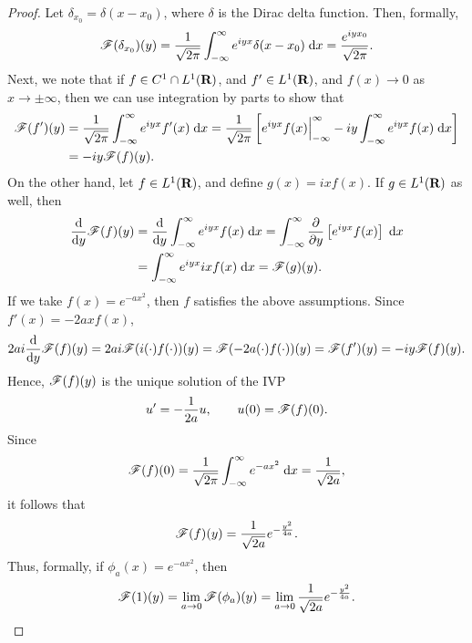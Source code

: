 \documentclass{homework}
\begin{document}
\begin{arabicparts}
		\begin{proof}
			Let $\delta_{x_0} = \delta(x-x_0)$, where $\delta$ is the Dirac delta function. Then, formally,
			\begin{equation}
				\mathscr{F}(\delta_{x_0})(y) = \frac{1}{\sqrt{2\pi}}\int_{-\infty}^\infty e^{iyx}\delta(x-x_0)\;\text{d} x = \frac{e^{iyx_0}}{\sqrt{2\pi}}.
			\end{equation}
			Next, we note that if $f \in C^1\cap L^1(\textnormal{\bf R})$, and $f' \in L^1(\textnormal{\bf R})$, and $f(x)\to 0$ as $x\to\pm\infty$, then we can use integration by parts to show that
			\begin{align}
				\mathscr{F}(f')(y) &= \frac{1}{\sqrt{2\pi}}\int_{-\infty}^\infty e^{iyx}f'(x)\;\text{d} x = \frac{1}{\sqrt{2\pi}}\left[e^{iyx}f(x)\Big\vert_{-\infty}^\infty - iy\int_{-\infty}^\infty e^{iyx}f(x)\;\text{d} x\right] \\
				&= -iy\mathscr{F}(f)(y).
			\end{align}
			On the other hand, let $f\in L^1(\textnormal{\bf R})$, and define $g(x) = ixf(x)$. If $g \in L^1(\textnormal{\bf R})$ as well, then
			\begin{align}
				\frac{\text{d} {}}{\text{d} {y}} \mathscr{F}(f)(y) &= \frac{\text{d} {}}{\text{d} {y}}\int_{-\infty}^\infty e^{iyx}f(x)\;\text{d} x =\int_{-\infty}^\infty \frac{\partial }{\partial y}\left[e^{iyx}f(x)\right]\;\text{d} x \\
				&= \int_{-\infty}^\infty e^{iyx}ixf(x)\;\text{d} x = \mathscr{F}(g)(y).
			\end{align}
			If we take $f(x) = e^{-ax^2}$, then $f$ satisfies the above assumptions. Since $f'(x) = -2axf(x)$,
			\begin{equation}
				2ai \frac{\text{d} {}}{\text{d} {y}}\mathscr{F}(f)(y) = 2ai\mathscr{F}(i(\cdot)f(\cdot))(y) = \mathscr{F}(-2a(\cdot)f(\cdot))(y) = \mathscr{F}(f')(y) =-iy\mathscr{F}(f)(y).
			\end{equation}
			Hence, $\mathscr{F}(f)(y)$ is the unique solution of the IVP
			\begin{equation}
				u' = -\frac{1}{2a}u,\qquad u(0) = \mathscr{F}(f)(0).
			\end{equation}
			Since
			\begin{equation}
				\mathscr{F}(f)(0) = \frac{1}{\sqrt{2\pi}}\int_{-\infty}^\infty e^{-ax^2}\;\text{d} x = \frac{1}{\sqrt{2a}},
			\end{equation}
			it follows that
			\begin{equation}
				\mathscr{F}(f)(y) = \frac{1}{\sqrt{2a}} e^{-\frac{y^2}{4a}}.
			\end{equation}
			Thus, formally, if $\phi_a(x) = e^{-ax^2}$, then
			\begin{equation}
				\mathscr{F}(1)(y) = \lim_{a\to 0}\mathscr{F}(\phi_a)(y)= \lim_{a\to 0}\frac{1}{\sqrt{2a}}e^{-\frac{y^2}{4a}}.
			\end{equation}
		\end{proof}
	\end{arabicparts}
\end{document}
